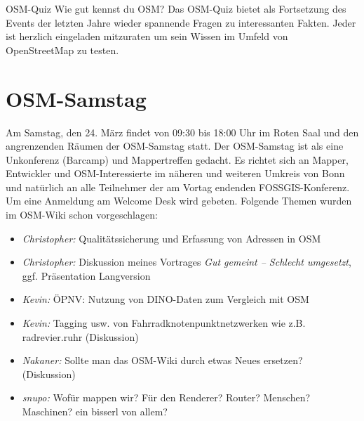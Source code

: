 %
{OSM-Quiz}%
{Wie gut kennst du OSM?}%
{Das OSM-Quiz bietet als Fortsetzung des Events der letzten Jahre wieder spannende Fragen zu
interessanten Fakten. Jeder ist herzlich eingeladen mitzuraten um sein Wissen im Umfeld von
OpenStreetMap zu testen.}


\vspace{-1.0\baselineskip}


\newpage
\section*{OSM-Samstag}
\pagestyle{cropmarksstyle}
\label{osm-samstag}
Am Samstag, den 24. März findet von 09:30 bis 18:00 Uhr im Roten Saal und den angrenzenden Räumen der OSM-Samstag statt.
Der OSM-Samstag ist als eine Unkonferenz (Barcamp) und Mappertreffen gedacht.
Es richtet sich an Mapper, Entwickler und OSM-Interessierte im näheren und
weiteren Umkreis von Bonn und natürlich an alle Teilnehmer der am Vortag
endenden FOSSGIS-Konferenz. Um eine Anmeldung am Welcome Desk wird gebeten.
Folgende Themen wurden im OSM-Wiki schon vorgeschlagen:
\begin{itemize}
  \RaggedRight
  \setlength{\itemsep}{-1pt}
  \item \emph{Christopher:} Qualitätssicherung und Erfassung von Adressen in OSM
  \item \emph{Christopher:} Diskussion meines Vortrages \emph{Gut gemeint -- Schlecht umgesetzt}, ggf. Präsentation Langversion 
  \item \emph{Kevin:} ÖPNV: Nutzung von DINO-Daten zum Vergleich mit OSM
  \item \emph{Kevin:} Tagging usw. von Fahrradknotenpunktnetzwerken wie z.B. radrevier.ruhr (Diskussion)
  \item \emph{Nakaner:} Sollte man das OSM-Wiki durch etwas Neues ersetzen? (Diskussion)
  \item \emph{snupo:} Wofür mappen wir? Für den Renderer? Router? Menschen? Maschinen? ein bisserl von allem?
\end{itemize}
\vfill
\justifying

\newpage
